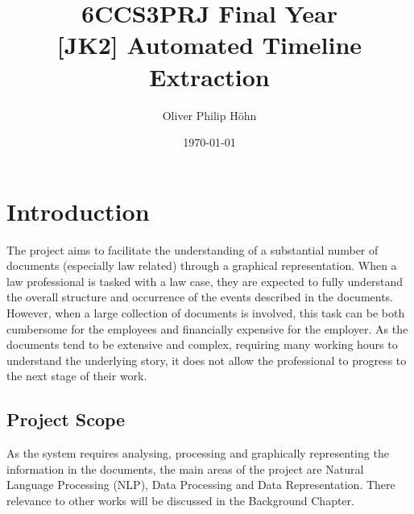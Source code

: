 \documentclass[11pt]{informatics-report}
\title{6CCS3PRJ Final Year\\\vspace{0.2cm}[JK2] Automated Timeline Extraction}
\author{Oliver Philip H\"ohn}
\date{\today}
\begin{document}
\createFrontMatter
\onehalfspacing
\tableofcontents
\doublespacing


\chapter{Introduction}
\par The project aims to facilitate the understanding of a substantial number of documents (especially law related) through a graphical representation. When a law professional is tasked with a law case, they are expected to fully understand the overall structure and occurrence of the events described in the documents. However, when a large collection of documents is involved, this task can be both cumbersome for the employees and  financially expensive for the employer. As the documents tend to be extensive and complex, requiring many working hours to understand the underlying story, it does not allow the professional to progress to the next stage of their work.
\section{Project Scope}
\par As the system requires analysing, processing and graphically representing the information in the documents, the main areas of the project are Natural Language Processing (NLP), Data Processing and Data Representation. There relevance to other works will be discussed in the Background Chapter.
\end{document}
